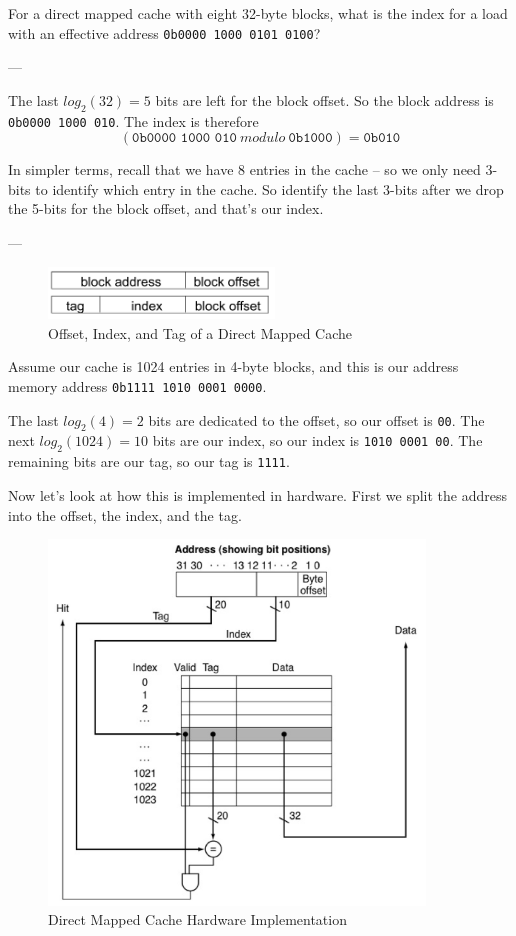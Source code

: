 \documentclass{article}
\begin{document}
For a direct mapped cache with eight 32-byte blocks, what is the index for a load with an effective address \texttt{0b0000 1000 0101 0100}?

---

The last $log_2(32) = 5$ bits are left for the block offset. So the block address is \texttt{0b0000 1000 010}. The index is therefore $$(\texttt{0b0000 1000 010}\ modulo\ \texttt{0b1000}) = \texttt{0b010}$$

In simpler terms, recall that we have 8 entries in the cache -- so we only need 3-bits to identify which entry in the cache. So identify the last 3-bits after we drop the 5-bits for the block offset, and that's our index.

--- 

\begin{figure}[ht!]
\centering
\includegraphics[width=60mm]{img/dmc.png}
\caption{Offset, Index, and Tag of a Direct Mapped Cache}
\end{figure}


Assume our cache is 1024 entries in 4-byte blocks, and this is our address memory address \texttt{0b1111 1010 0001 0000}.

The last $log_2(4) = 2$ bits are dedicated to the offset, so our offset is \texttt{00}. The next $log_2(1024) = 10$ bits are our index, so our index is \texttt{1010 0001 00}. The remaining bits are our tag, so our tag is \texttt{1111}.

Now let's look at how this is implemented in hardware. First we split the address into the offset, the index, and the tag. 

\begin{figure}[ht!]
\centering
\includegraphics[width=100mm]{img/dmch.png}
\caption{Direct Mapped Cache Hardware Implementation}
\end{figure}
\end{document}
